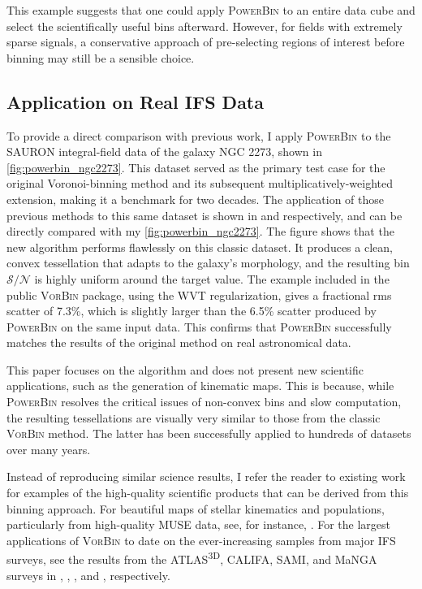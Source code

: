 \documentclass[fleqn,usenatbib]{mnras}
\newcommand{\sn}{\mathcal{S/N}}
\begin{document}
This example suggests that one could apply \textsc{PowerBin} to an entire data cube and select the scientifically useful bins afterward. However, for fields with extremely sparse signals, a conservative approach of pre-selecting regions of interest before binning may still be a sensible choice.

\subsection{Application on Real IFS Data}
  
To provide a direct comparison with previous work, I apply \textsc{PowerBin} to the SAURON integral-field data of the galaxy NGC 2273, shown in \autoref{fig:powerbin_ngc2273}. This dataset served as the primary test case for the original Voronoi-binning method and its subsequent multiplicatively-weighted extension, making it a benchmark for two decades. 
The application of those previous methods to this same dataset is shown in \citet[][fig.~8]{Cappellari2003} and \citet[][fig.~5]{Diehl2006} respectively, and can be directly compared with my \autoref{fig:powerbin_ngc2273}. 
The figure shows that the new algorithm performs flawlessly on this classic dataset. It produces a clean, convex tessellation that adapts to the galaxy's morphology, and the resulting bin $\sn$ is highly uniform around the target value. The example included in the public \textsc{VorBin} package, using the WVT regularization, gives a fractional rms scatter of 7.3\%, which is slightly larger than the 6.5\% scatter produced by \textsc{PowerBin} on the same input data. This confirms that \textsc{PowerBin} successfully matches the results of the original method on real astronomical data.

This paper focuses on the algorithm and does not present new scientific applications, such as the generation of kinematic maps. This is because, while \textsc{PowerBin} resolves the critical issues of non-convex bins and slow computation, the resulting tessellations are visually very similar to those from the classic \textsc{VorBin} method. The latter has been successfully applied to hundreds of datasets over many years.

Instead of reproducing similar science results, I refer the reader to existing work for examples of the high-quality scientific products that can be derived from this binning approach. For beautiful maps of stellar kinematics and populations, particularly from high-quality MUSE data, see, for instance, \citet{Krajnovic2015, Mitzkus2017, Gadotti2019, Gadotti2020, Bittner2020}. For the largest applications of \textsc{VorBin} to date on the ever-increasing samples from major IFS surveys, see the results from the ATLAS\textsuperscript{3D}, CALIFA, SAMI, and MaNGA surveys in \citet{Cappellari2011p1}, \citet{FalconBarroso2017}, \citet{vandeSande2017}, and \citet{Westfall2019}, respectively.
\end{document}
